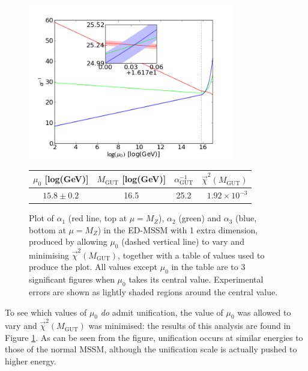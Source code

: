 \documentclass[12pt,a4paper,oneside]{article}
\begin{document}
\begin{figure}[th]
\begin{center}
\includegraphics[width=9cm]{figs/1ed-1param-fit.png}

\begin{tabular}{c|cc|r}
$\mu_0$ [log(GeV)] & $M_\mathrm{GUT}$ [log(GeV)] & $\alpha^{-1}_\mathrm{GUT}$ & $\overrightarrow{\chi}^2 (M_\mathrm{GUT})$ \\
\hline
$15.8 \pm 0.2$ & 16.5 & 25.2 & $1.92 \times 10^{-3}$ \\
\end{tabular}

\caption[]{Plot of $\alpha_1$ (red line, top at $\mu = M_Z$), $\alpha_2$ (green) and $\alpha_3$ (blue, bottom at $\mu = M_Z$) in the ED-MSSM with 1 extra dimension, produced by allowing $\mu_0$ (dashed vertical line) to vary and minimising $\overrightarrow{\chi}^2 (M_\mathrm{GUT})$, together with a table of values used to produce the plot. All values except $\mu_0$ in the table are to 3 significant figures when $\mu_0$ takes its central value. Experimental errors are shown as lightly shaded regions around the central value.}
\label{fig:ed-mssm-fit}
\end{center}
\end{figure}

To see which values of $\mu_0$ \textit{do} admit unification, the value of $\mu_0$ was allowed to vary and $\overrightarrow{\chi}^2 (M_\mathrm{GUT})$ was minimised: the results of this analysis are found in Figure \ref{fig:ed-mssm-fit}. As can be seen from the figure, unification occurs at similar energies to those of the normal MSSM, although the unification scale is actually pushed to higher energy. 
\end{document}
